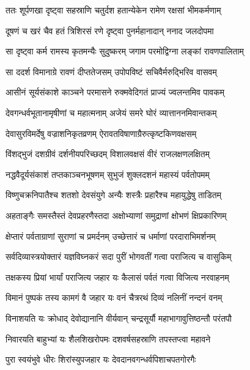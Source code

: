 
\twolineshloka
{ततः शूर्पणखा दृष्ट्वा सहस्राणि चतुर्दश}
{हतान्येकेन रामेण रक्षसां भीमकर्मणाम्} %

\twolineshloka
{दूषणं च खरं चैव हतं त्रिशिरसं रणे}
{दृष्ट्वा पुनर्महानादान् ननाद जलदोपमा} %

\twolineshloka
{सा दृष्ट्वा कर्म रामस्य कृतमन्यैः सुदुष्करम्}
{जगाम परमोद्विग्ना लङ्कां रावणपालिताम्} %

\twolineshloka
{सा ददर्श विमानाग्रे रावणं दीप्ततेजसम्}
{उपोपविष्टं सचिवैर्मरुद्भिरिव वासवम्} %

\twolineshloka
{आसीनं सूर्यसंकाशे काञ्चने परमासने}
{रुक्मवेदिगतं प्राज्यं ज्वलन्तमिव पावकम्} %

\twolineshloka
{देवगन्धर्वभूतानामृषीणां च महात्मनाम्}
{अजेयं समरे घोरं व्यात्ताननमिवान्तकम्} %

\twolineshloka
{देवासुरविमर्देषु वज्राशनिकृतव्रणम्}
{ऐरावतविषाणाग्रैरुत्कृष्टकिणवक्षसम्} %

\twolineshloka
{विंशद्भुजं दशग्रीवं दर्शनीयपरिच्छदम्}
{विशालवक्षसं वीरं राजलक्षणलक्षितम्} %

\twolineshloka
{नद्धवैदूर्यसंकाशं तप्तकाञ्चनभूषणम्}
{सुभुजं शुक्लदशनं महास्यं पर्वतोपमम्} %

\twolineshloka
{विष्णुचक्रनिपातैश्च शतशो देवसंयुगे}
{अन्यैः शस्त्रैः प्रहारैश्च महायुद्धेषु ताडितम्} %

\twolineshloka
{अहताङ्गैः समस्तैस्तं देवप्रहरणैस्तदा}
{अक्षोभ्याणां समुद्राणां क्षोभणं क्षिप्रकारिणम्} %

\twolineshloka
{क्षेप्तारं पर्वताग्राणां सुराणां च प्रमर्दनम्}
{उच्छेत्तारं च धर्माणां परदाराभिमर्शनम्} %

\twolineshloka
{सर्वदिव्यास्त्रयोक्तारं यज्ञविघ्नकरं सदा}
{पुरीं भोगवतीं गत्वा पराजित्य च वासुकिम्} %

\twolineshloka
{तक्षकस्य प्रियां भार्यां पराजित्य जहार यः}
{कैलासं पर्वतं गत्वा विजित्य नरवाहनम्} %

\twolineshloka
{विमानं पुष्पकं तस्य कामगं वै जहार यः}
{वनं चैत्ररथं दिव्यं नलिनीं नन्दनं वनम्} %

\twolineshloka
{विनाशयति यः क्रोधाद् देवोद्यानानि वीर्यवान्}
{चन्द्रसूर्यौ महाभागावुत्तिष्ठन्तौ परंतपौ} %

\twolineshloka
{निवारयति बाहुभ्यां यः शैलशिखरोपमः}
{दशवर्षसहस्राणि तपस्तप्त्वा महावने} %

\twolineshloka
{पुरा स्वयंभुवे धीरः शिरांस्युपजहार यः}
{देवदानवगन्धर्वपिशाचपतगोरगैः} %


